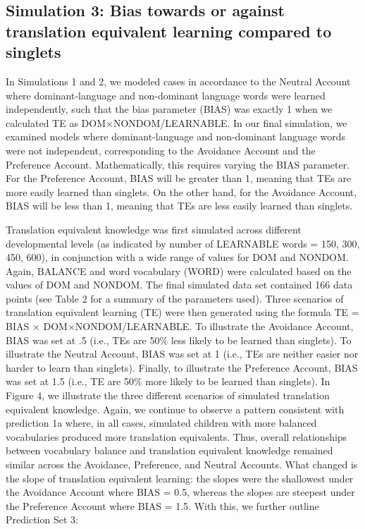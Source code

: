 \documentclass[
  english,
  ,man,floatsintext]{apa6}
\begin{document}
\hypertarget{simulation-3-bias-towards-or-against-translation-equivalent-learning-compared-to-singlets}{%
\subsection{Simulation 3: Bias towards or against translation equivalent learning compared to singlets}\label{simulation-3-bias-towards-or-against-translation-equivalent-learning-compared-to-singlets}}

In Simulations 1 and 2, we modeled cases in accordance to the Neutral Account where dominant-language and non-dominant language words were learned independently, such that the bias parameter (BIAS) was exactly 1 when we calculated TE as DOM×NONDOM/LEARNABLE. In our final simulation, we examined models where dominant-language and non-dominant language words were not independent, corresponding to the Avoidance Account and the Preference Account. Mathematically, this requires varying the BIAS parameter. For the Preference Account, BIAS will be greater than 1, meaning that TEs are more easily learned than singlets. On the other hand, for the Avoidance Account, BIAS will be less than 1, meaning that TEs are less easily learned than singlets.

Translation equivalent knowledge was first simulated across different developmental levels (as indicated by number of LEARNABLE words = 150, 300, 450, 600), in conjunction with a wide range of values for DOM and NONDOM. Again, BALANCE and word vocabulary (WORD) were calculated based on the values of DOM and NONDOM. The final simulated data set contained 166 data points (see Table 2 for a summary of the parameters used). Three scenarios of translation equivalent learning (TE) were then generated using the formula TE = BIAS × DOM×NONDOM/LEARNABLE. To illustrate the Avoidance Account, BIAS was set at .5 (i.e., TEs are 50\% less likely to be learned than singlets). To illustrate the Neutral Account, BIAS was set at 1 (i.e., TEs are neither easier nor harder to learn than singlets). Finally, to illustrate the Preference Account, BIAS was set at 1.5 (i.e., TE are 50\% more likely to be learned than singlets). In Figure 4, we illustrate the three different scenarios of simulated translation equivalent knowledge. Again, we continue to observe a pattern consistent with prediction 1a where, in all cases, simulated children with more balanced vocabularies produced more translation equivalents. Thus, overall relationships between vocabulary balance and translation equivalent knowledge remained similar across the Avoidance, Preference, and Neutral Accounts. What changed is the slope of translation equivalent learning: the slopes were the shallowest under the Avoidance Account where BIAS = 0.5, whereas the slopes are steepest under the Preference Account where BIAS = 1.5. With this, we further outline Prediction Set 3:
\end{document}
